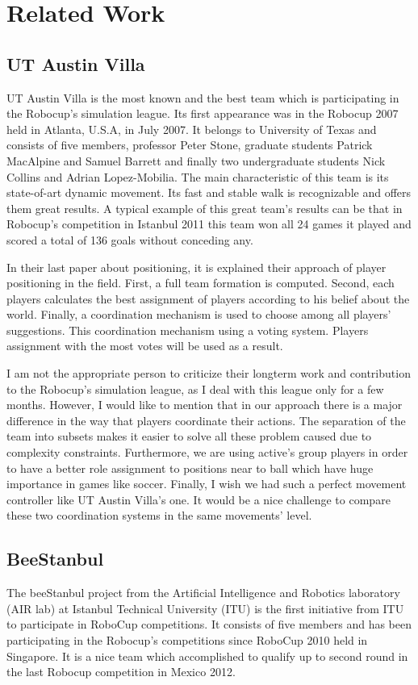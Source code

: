 \chapter{Related Work}
\label{related}

\section{UT Austin Villa}\cite{UTAustinVillaRobotSoccerTeam}
UT Austin Villa is the most known and the best team which is participating in the Robocup's simulation league. Its first appearance was in the Robocup 2007 held in Atlanta, U.S.A, in July 2007. It belongs to University of Texas and consists of five members, professor Peter Stone, 
graduate students Patrick MacAlpine and Samuel Barrett and finally two undergraduate students Nick Collins and Adrian Lopez-Mobilia. The main characteristic of this team is its state-of-art dynamic movement. Its fast and stable walk is recognizable and offers them great results. A typical example of this great team's results can be that in Robocup's competition in Istanbul 2011 this team won all 24 games it played and scored a total of 136 goals without conceding any.

In their last paper \cite{UtAustinVillaPaper} about positioning, it is explained their approach of player positioning in the field. First, a full team formation is computed. Second, each players calculates the best assignment of players according to his belief about the world. Finally, a coordination mechanism is used to choose among all players' suggestions. This coordination mechanism using a voting system. Players assignment with the most votes will be used as a result.

I am not the appropriate person to criticize their longterm work and contribution to the Robocup's simulation league, as I deal with this league only for a few months. However, I would like to mention that in our approach there is a major difference in the way that players coordinate their actions. The separation of the team into subsets makes it easier to solve all these problem caused due to complexity constraints. Furthermore, we are using active's group players in order to have a better role assignment to positions near to ball which have huge importance in games like soccer. Finally, I wish we had such a perfect movement controller like UT Austin Villa's one. It would be a nice challenge to compare these two coordination systems in the same movements' level.


\section{BeeStanbul}
\cite{BeeStanbulTDP} The beeStanbul project from the Artificial Intelligence and Robotics laboratory
(AIR lab) at Istanbul Technical University (ITU) is the first initiative from ITU
to participate in RoboCup competitions. It consists of five members and has been participating in the Robocup's competitions since RoboCup 2010 held in Singapore. It is a nice team which accomplished to qualify up to second round in the last Robocup competition in Mexico 2012.

